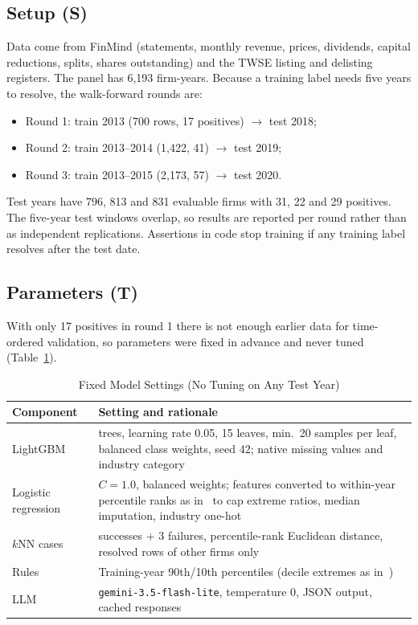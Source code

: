 \documentclass[conference]{IEEEtran}
\begin{document}
\subsection{Setup (S)}
Data come from FinMind (statements, monthly revenue, prices, dividends, capital reductions, splits, shares outstanding) and the TWSE listing and delisting registers. The panel has 6,193 firm-years. Because a training label needs five years to resolve, the walk-forward rounds are:
\begin{itemize}
\item Round 1: train 2013 (700 rows, 17 positives) $\rightarrow$ test 2018;
\item Round 2: train 2013--2014 (1,422, 41) $\rightarrow$ test 2019;
\item Round 3: train 2013--2015 (2,173, 57) $\rightarrow$ test 2020.
\end{itemize}
Test years have 796, 813 and 831 evaluable firms with 31, 22 and 29 positives. The five-year test windows overlap, so results are reported per round rather than as independent replications. Assertions in code stop training if any training label resolves after the test date.

\subsection{Parameters (T)}
With only 17 positives in round 1 there is not enough earlier data for time-ordered validation, so parameters were fixed in advance and never tuned (Table~\ref{tab:params}).

\begin{table}[t]
\centering
\caption{Fixed Model Settings (No Tuning on Any Test Year)}
\label{tab:params}
\small
\begin{tabularx}{\columnwidth}{@{}l>{\raggedright\arraybackslash}X@{}}
\toprule
Component & Setting and rationale \\
\midrule
LightGBM & 200 trees, learning rate 0.05, 15 leaves, min.\ 20 samples per leaf, balanced class weights, seed 42; native missing values and industry category \\
Logistic regression & $C=1.0$, balanced weights; features converted to within-year percentile ranks as in~\cite{b9} to cap extreme ratios, median imputation, industry one-hot \\
$k$NN cases & 3 successes + 3 failures, percentile-rank Euclidean distance, resolved rows of other firms only \\
Rules & Training-year 90th/10th percentiles (decile extremes as in~\cite{b15,b16}) \\
LLM & \texttt{gemini-3.5-flash-lite}, temperature 0, JSON output, cached responses \\
\bottomrule
\end{tabularx}
\end{table}
\end{document}
